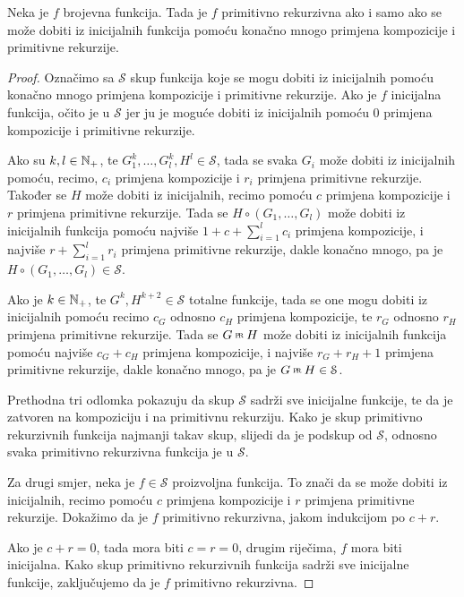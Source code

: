 \begin{propozicija}[{name=[simboličke definicije primitivno rekurzivnih funkcija]}]\label{prop:symbdef}
Neka je $f$ brojevna funkcija. Tada je $f$ primitivno rekurzivna ako i samo ako se može dobiti iz inicijalnih funkcija pomoću konačno mnogo primjena kompozicije i primitivne rekurzije.
\end{propozicija}
\begin{proof}
Označimo sa $\mathcal S$ skup funkcija koje se mogu dobiti iz inicijalnih pomoću ko\-nač\-no mnogo primjena kompozicije i primitivne rekurzije. Ako je $f$ inicijalna funkcija, očito je u $\mathcal S$ jer ju je moguće dobiti iz inicijalnih pomoću $0$ primjena kompozicije i primitivne rekurzije.

Ako su $k,l\in{\mathbb N}_+$, te $G_1^k,\dotsc,G_l^k,H^l\in\mathcal S$, tada se svaka $G_i$ može dobiti iz inicijalnih pomoću, recimo, $c_i$ primjena kompozicije i $r_i$ primjena primitivne rekurzije. Također se $H$ može dobiti iz inicijalnih, recimo pomoću $c$ primjena kompozicije i $r$ primjena primitivne rekurzije. Tada se $H\circ(G_1,\dotsc,G_l)$ može dobiti iz inicijalnih funkcija pomoću najviše $1+c+\sum_{i=1}^lc_i$ primjena kompozicije, i najviše $r+\sum_{i=1}^lr_i$ primjena primitivne rekurzije, dakle konačno mnogo, pa je $H\circ(G_1,\dotsc,G_l)\in\mathcal S$.

Ako je $k\in{\mathbb N}_+$, te $G^k,H^{k+2}\in\mathcal S$ totalne funkcije, tada se one mogu dobiti iz inicijalnih pomoću recimo $c_G$ odnosno $c_H$ primjena kompozicije, te $r_G$ odnosno $r_H$ primjena primitivne rekurzije. Tada se $G\pr H$ može dobiti iz inicijalnih funkcija pomoću najviše $c_G+c_H$ primjena kompozicije, i najviše $r_G+r_H+1$ primjena primitivne rekurzije, dakle konačno mnogo, pa je $G\pr H\in\mathcal S$.

Prethodna tri odlomka pokazuju da skup $\mathcal S$ sadrži sve inicijalne funkcije, te da je zatvoren na kompoziciju i na primitivnu rekurziju. Kako je skup primitivno rekurzivnih funkcija najmanji takav skup, slijedi da je podskup od $\mathcal S$, odnosno svaka primitivno rekurzivna funkcija je u $\mathcal S$.

Za drugi smjer, neka je $f\in\mathcal S$ proizvoljna funkcija. To znači da se može dobiti iz inicijalnih, recimo pomoću $c$ primjena kompozicije i $r$ primjena primitivne rekurzije. Dokažimo da je $f$ primitivno rekurzivna, jakom indukcijom po $c+r$.

Ako je $c+r=0$, tada mora biti $c=r=0$, drugim riječima, $f$ mora biti inicijalna. Kako skup primitivno rekurzivnih funkcija sadrži sve inicijalne funkcije, zaključujemo da je $f$ primitivno rekurzivna.


\end{proof}
